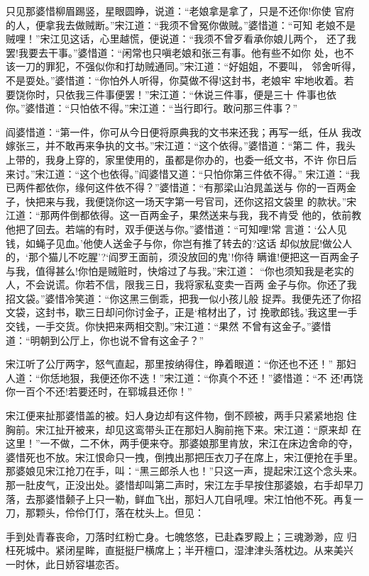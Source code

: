 只见那婆惜柳眉踢竖，星眼圆睁，说道：“老娘拿是拿了，只是不还你!你使
官府的人，便拿我去做贼断。”宋江道：“我须不曾冤你做贼。”婆惜道：“可知
老娘不是贼哩！”宋江见这话，心里越慌，便说道：“我须不曾歹看承你娘儿两个，
还了我罢!我要去干事。”婆惜道：“闲常也只嗔老娘和张三有事。他有些不如你
处，也不该一刀的罪犯，不强似你和打劫贼通同。”宋江道：“好姐姐，不要叫，
邻舍听得，不是耍处。”婆惜道：“你怕外人听得，你莫做不得!这封书，老娘牢
牢地收着。若要饶你时，只依我三件事便罢！”宋江道：“休说三件事，便是三十
件事也依你。”婆惜道：“只怕依不得。”宋江道：“当行即行。敢问那三件事？”

阎婆惜道：“第一件，你可从今日便将原典我的文书来还我；再写一纸，任从
我改嫁张三，并不敢再来争执的文书。”宋江道：“这个依得。”婆惜道：“第二
件，我头上带的，我身上穿的，家里使用的，虽都是你办的，也委一纸文书，不许
你日后来讨。”宋江道：“这个也依得。”阎婆惜又道：“只怕你第三件依不得。”
宋江道：“我已两件都依你，缘何这件依不得？”婆惜道：“有那梁山泊晁盖送与
你的一百两金子，快把来与我，我便饶你这一场天字第一号官司，还你这招文袋里
的款状。”宋江道：“那两件倒都依得。这一百两金子，果然送来与我，我不肯受
他的，依前教他把了回去。若端的有时，双手便送与你。”婆惜道：“可知哩!常
言道：‘公人见钱，如蝇子见血。’他使人送金子与你，你岂有推了转去的?这话
却似放屁!做公人的，‘那个猫儿不吃腥’?‘阎罗王面前，须没放回的鬼’!你待
瞒谁!便把这一百两金子与我，值得甚么!你怕是贼赃时，快熔过了与我。”宋江道：
“你也须知我是老实的人，不会说谎。你若不信，限我三日，我将家私变卖一百两
金子与你。你还了我招文袋。”婆惜冷笑道：“你这黑三倒乖，把我一似小孩儿般
捉弄。我便先还了你招文袋，这封书，歇三日却问你讨金子，正是‘棺材出了，讨
挽歌郎钱。’我这里一手交钱，一手交货。你快把来两相交割。”宋江道：“果然
不曾有这金子。”婆惜道：“明朝到公厅上，你也说不曾有这金子？”

宋江听了公厅两字，怒气直起，那里按纳得住，睁着眼道：“你还也不还！”
那妇人道：“你恁地狠，我便还你不迭！”宋江道：“你真个不还！”婆惜道：“不
还!再饶你一百个不还!若要还时，在郓城县还你！”

宋江便来扯那婆惜盖的被。妇人身边却有这件物，倒不顾被，两手只紧紧地抱
住胸前。宋江扯开被来，却见这鸾带头正在那妇人胸前拖下来。宋江道：“原来却
在这里！”一不做，二不休，两手便来夺。那婆娘那里肯放，宋江在床边舍命的夺，
婆惜死也不放。宋江恨命只一拽，倒拽出那把压衣刀子在席上，宋江便抢在手里。
那婆娘见宋江抢刀在手，叫：“黑三郎杀人也！”只这一声，提起宋江这个念头来。
那一肚皮气，正没出处。婆惜却叫第二声时，宋江左手早按住那婆娘，右手却早刀
落，去那婆惜颡子上只一勒，鲜血飞出，那妇人兀自吼哩。宋江怕他不死。再复一
刀，那颗头，伶伶仃仃，落在枕头上。但见：

手到处青春丧命，刀落时红粉亡身。七魄悠悠，已赴森罗殿上；三魂渺渺，应
归枉死城中。紧闭星眸，直挺挺尸横席上；半开檀口，湿津津头落枕边。从来美兴
一时休，此日娇容堪恋否。

